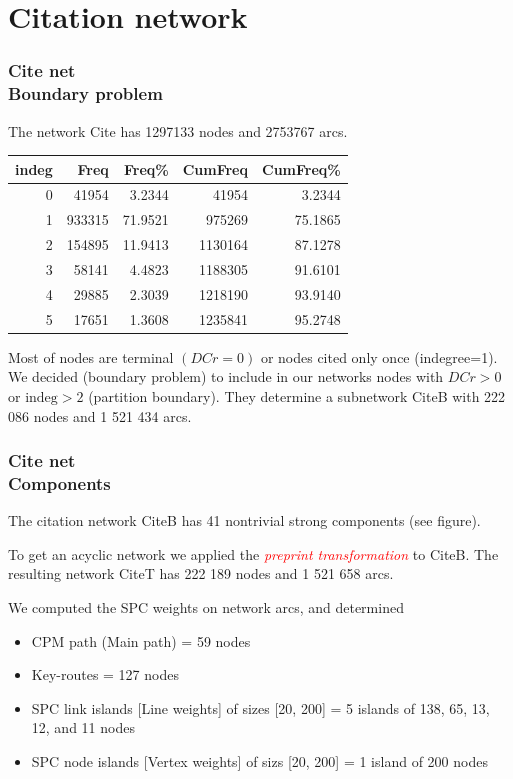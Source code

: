 \documentclass[hyperref={pdfstartview={FitBH -32768},
                         pdfpagemode=FullScreen,
                         plainpages=false,
                         colorlinks=true}
              ]{beamer}
\newcommand{\keyw}[1]{\textcolor{red}{\emph{#1}}}
\newcommand{\indeg}{\mbox{indeg}}
\begin{document}
\section{Citation network}  


\begin{frame}[fragile]
\frametitle{Cite net \\ \normalsize Boundary problem}
\small 

The network Cite has 1297133  nodes and 2753767 arcs.
\medskip

\begin{tabular}{r|r|r|r|r|}
 indeg &       Freq &    Freq\%  &  CumFreq &  CumFreq\% \\ \hline
 0     & 41954   &  3.2344     & 41954   &  3.2344  \\ 
1   &  933315  &  71.9521   &  975269  & 75.1865  \\
2   &  154895   & 11.9413   & 1130164  &  87.1278 \\
3   &  58141    & 4.4823   & 1188305   & 91.6101  \\ 
4   &  29885   & 2.3039  & 1218190  & 93.9140 \\  
5   &  17651   & 1.3608   & 1235841  & 95.2748  \\ \hline
\end{tabular}

\medskip

Most of nodes are terminal $(DCr=0)$ or nodes cited only once (indegree=1). We decided (boundary problem) to include in our networks nodes with $DCr > 0$ or $\indeg > 2$ (partition boundary). They determine a subnetwork CiteB with  222 086 nodes and 1 521 434 arcs.

\end{frame}

\begin{frame}[fragile]
\frametitle{Cite net \\ \normalsize Components}
\small
The citation network CiteB has 41 nontrivial strong components (see figure).
 
To get an acyclic network we applied the \keyw{preprint transformation} to CiteB. The resulting network CiteT has 222 189 nodes and 1 521 658 arcs. 

We computed the SPC weights on network arcs, and determined 
\begin{itemize}
\item CPM path (Main path) = 59 nodes
\item Key-routes = 127 nodes  
\item SPC link islands [Line weights] of sizes [20, 200] = 5 islands of 138, 65, 13, 12, and 11 nodes  
\item SPC node islands [Vertex weights] of sizs  [20, 200] = 1 island of 200 nodes
\end{itemize}



\end{frame}
\end{document}
